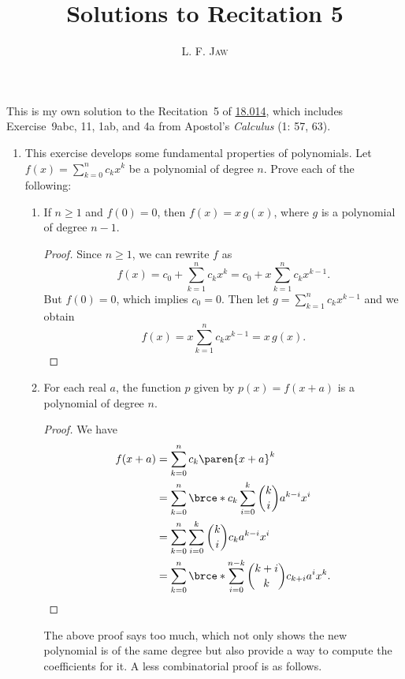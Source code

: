 \documentclass[a4paper]{article}
\title{Solutions to Recitation 5}
\author{L. F. \textsc{Jaw}}
\begin{document}
\maketitle

This is my own solution to the Recitation~5 of
\href{https://ocw.mit.edu/courses/mathematics/18-014-calculus-with-theory-fall-2010/recitations/}{18.014},
which includes Exercise~9abc, 11, 1ab, and 4a from Apostol's
\textit{Calculus} (1: 57, 63).

\begin{enumerate}
\item This exercise develops some fundamental properties of
  polynomials.  Let \(f(x) = \sum_{k=0}^n c_k x^k\) be a polynomial of
  degree \(n\).  Prove each of the following:
  \begin{enumerate}
  \item If \(n \ge 1\) and \(f(0) = 0\), then \(f(x) = x \, g(x)\), where
    \(g\) is a polynomial of degree \(n-1\).

    \begin{proof}
      Since \(n \ge 1\), we can rewrite \(f\) as
      \begin{displaymath}
        f(x) = c_0 + \sum_{k=1}^n c_k x^k = c_0 + x \sum_{k=1}^n c_k x^{k-1}.
      \end{displaymath}
      But \(f(0) = 0\), which implies \(c_0 = 0\).  Then let
      \(g = \sum_{k=1}^n c_k x^{k-1}\) and we obtain
      \begin{displaymath}
        f(x) = x \sum_{k=1}^n c_k x^{k-1} = x \, g(x).
      \end{displaymath}
    \end{proof}

  \item For each real \(a\), the function \(p\) given by
    \(p(x) = f(x+a)\) is a polynomial of degree \(n\).

    \begin{proof}
      We have
      \begin{align*}
        f(x+a) &= \sum_{k=0}^n c_k \paren{x+a}^k \\
               &= \sum_{k=0}^n \brce*{ c_k \sum_{i=0}^k \binom{k}{i} a^{k-i} x^i } \\
               &= \sum_{k=0}^n \sum_{i=0}^k \binom{k}{i} c_k a^{k-i} x^i \\
               &= \sum_{k=0}^n \brce*{ \sum_{i=0}^{n-k} \binom{k+i}{k} c_{k+i} a^{i} } x^k. \qedhere
      \end{align*}
    \end{proof}
    The above proof says too much, which not only shows the new
    polynomial is of the same degree but also provide a way to compute
    the coefficients for it.  A less combinatorial proof is as
    follows.


\end{enumerate}
\end{enumerate}
\end{document}
